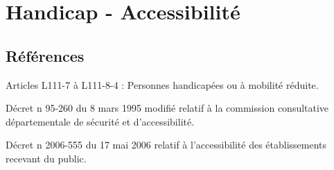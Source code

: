 \documentclass[hidelinks, paper=a4, fontsize=13pt]{report}
\begin{document}





\chapter{ Handicap - Accessibilité}

\section{Références}

\begin{list}{•}{}
\item Articles L111-7 à L111-8-4 : Personnes handicapées ou à mobilité réduite.
\item Décret n  95-260 du 8 mars 1995 modifié relatif à la commission consultative départementale de sécurité et d'accessibilité.
\item Décret  n 2006-555 du 17 mai 2006 relatif à l'accessibilité des établissements recevant du public.
\end{list}
\end{document}
